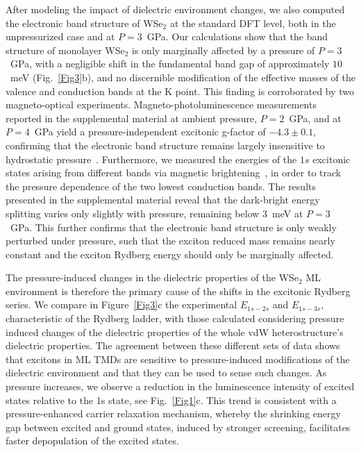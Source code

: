 \documentclass[twocolumn,showpacs,preprintnumbers,prl,fleqn,superscriptaddress]{revtex4-2}
\begin{document}
After modeling the impact of dielectric environment changes, we also computed the electronic band structure of WSe$_2$ at the standard DFT level, both in the unpressurized case and at $P = 3$~GPa. Our calculations show that the band structure of monolayer WSe$_2$ is only marginally affected by a pressure of $P = 3$~GPa, with a negligible shift in the fundamental band gap of approximately $10$~meV (Fig.~\ref{Fig3}b), and no discernible modification of the effective masses of the valence and conduction bands at the K point. This finding is corroborated by two magneto-optical experiments. Magneto-photoluminescence measurements reported in the supplemental material at ambient pressure, $P = 2$~GPa, and at $P = 4$~GPa yield a pressure-independent excitonic g-factor of $-4.3 \pm 0.1$, confirming that the electronic band structure remains largely insensitive to hydrostatic pressure~\cite{Rybkovskiy2017}. Furthermore, we measured the energies of the $1s$ excitonic states arising from different bands via magnetic brightening~\cite{molas2017}, in order to track the pressure dependence of the two lowest conduction bands. The results presented in the supplemental material reveal that the dark-bright energy splitting varies only slightly with pressure, remaining below $3$~meV at $P = 3$~GPa. This further confirms that the electronic band structure is only weakly perturbed under pressure, such that the exciton reduced mass remains nearly constant and the exciton Rydberg energy should only be marginally affected.



The pressure-induced changes in the dielectric properties of the WSe$_2$ ML environment is therefore the primary cause of the shifts in the excitonic Rydberg series. We compare in Figure~\ref{Fig3}c the experimental $E_{1s-2s}$ and $E_{1s-3s}$, characteristic of the Rydberg ladder, with those calculated considering pressure induced changes of the dielectric properties of the whole vdW heterostructure's dielectric properties. The agreement between these different sets of data shows that excitons in ML TMDs are sensitive to pressure-induced modifications of the dielectric environment and that they can be used to sense such changes. As pressure increases, we observe a reduction in the luminescence intensity of excited states relative to the 1s state, see Fig.~\ref{Fig1}c. This trend is consistent with a pressure-enhanced carrier relaxation mechanism, whereby the shrinking energy gap between excited and ground states, induced by stronger screening, facilitates faster depopulation of the excited states.
\end{document}
